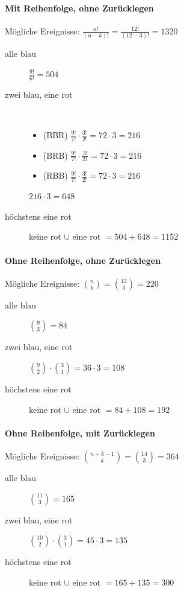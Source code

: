 \documentclass[11pt, a4paper]{article}
\begin{document}
\paragraph{Mit Reihenfolge, ohne Zurücklegen}
Mögliche Ereignisse: $\frac{n!}{(n-k)!} = \frac{12!}{(12-3)!} = 1320$
\begin{description}
	\item[alle blau] $\frac{9!}{6!} = 504$
	\item[zwei blau, eine rot] \
		\begin{itemize}
			\item (BBR) $\frac{9!}{7!} \cdot \frac{3!}{2!} = 72 \cdot 3 = 216$
			\item (BRB) $\frac{9!}{7!} \cdot \frac{3!}{21} = 72 \cdot 3 = 216$
			\item (RBB) $\frac{9!}{7!} \cdot \frac{3!}{2!} = 72 \cdot 3 = 216$
		\end{itemize}
		$216 \cdot 3 = 648$
	\item[höchstens eine rot] keine rot $\cup$ eine rot $= 504 + 648 = 1152$
\end{description}

\paragraph{Ohne Reihenfolge, ohne Zurücklegen}
Mögliche Ereignisse: $\binom{n}{k} = \binom{12}{3} = 220$
\begin{description}
	\item[alle blau] $\binom{9}{3} = 84$
	\item[zwei blau, eine rot] $\binom{9}{2} \cdot \binom{3}{1} = 36 \cdot 3 = 108$
	\item[höchstens eine rot] keine rot $\cup$ eine rot $= 84 + 108 = 192$
\end{description}

\paragraph{Ohne Reihenfolge, mit Zurücklegen}
Mögliche Ereignisse: $\binom{n+k-1}{k} = \binom{14}{3} = 364$
\begin{description}
	\item[alle blau] $\binom{11}{3} = 165$
	\item[zwei blau, eine rot] $\binom{10}{2} \cdot \binom{3}{1} = 45 \cdot 3 = 135$
	\item[höchstens eine rot] keine rot $\cup$ eine rot $= 165 + 135 = 300$
\end{description}
\end{document}

